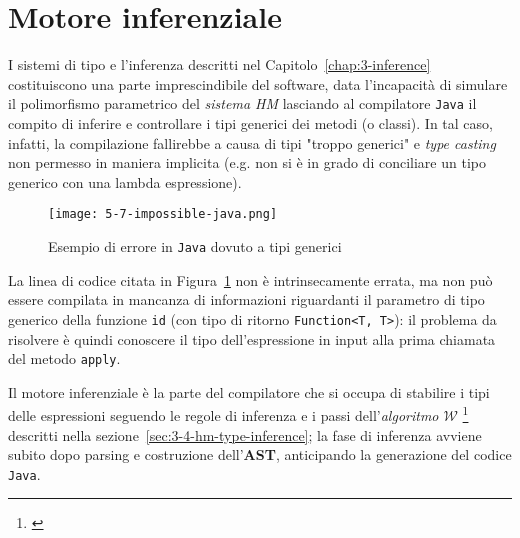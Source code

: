 \section{Motore inferenziale}
\label{sec:5-7-inference-engine}

I sistemi di tipo e l'inferenza descritti nel Capitolo~\ref{chap:3-inference} costituiscono una parte imprescindibile del software,
data l'incapacità di simulare il polimorfismo parametrico del \textit{sistema HM} lasciando al compilatore \texttt{Java}
il compito di inferire e controllare i tipi generici dei metodi (o classi).
In tal caso, infatti, la compilazione fallirebbe a causa di tipi "troppo generici" e \textit{type casting} non permesso
in maniera implicita (e.g. non si è in grado di conciliare un tipo generico con una lambda espressione).

\begin{figure}
    \vspace{4mm}
    \texttt{[image: 5-7-impossible-java.png]}
    \caption{Esempio di errore in \texttt{Java} dovuto a tipi generici}
    \label{fig:5-7-impossible-java}
    \vspace{4mm}
\end{figure}

\noindent La linea di codice citata in Figura~\ref{fig:5-7-impossible-java} non è intrinsecamente errata,
ma non può essere compilata in mancanza di informazioni riguardanti il parametro di tipo generico della funzione \texttt{id}
(con tipo di ritorno \texttt{Function<T, T>}): il problema da risolvere è quindi conoscere il tipo dell'espressione
in input alla prima chiamata del metodo \texttt{apply}.


Il motore inferenziale è la parte del compilatore che si occupa di stabilire i tipi delle espressioni seguendo le regole
di inferenza e i passi dell'\textit{algoritmo $\mathcal{W}$}%
\footnote{ \cite{Grabmuller-2006-AlgorithmW}}
descritti nella sezione~\ref{sec:3-4-hm-type-inference}; la fase di inferenza avviene subito dopo parsing
e costruzione dell'\textbf{AST}, anticipando la generazione del codice \texttt{Java}.



\newpage

